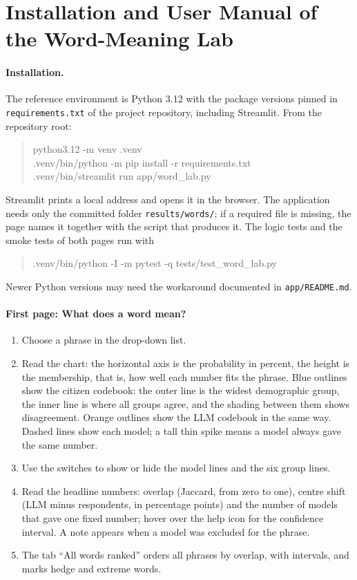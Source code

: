 \section{Installation and User Manual of the Word-Meaning Lab}
\label{app:manual}

\paragraph{Installation.}
The reference environment is Python 3.12 with the package versions pinned in \texttt{requirements.txt} of the project
repository, including Streamlit.
From the repository root:
\begin{quote}\small\ttfamily
python3.12 -m venv .venv\\
.venv/bin/python -m pip install -r requirements.txt\\
.venv/bin/streamlit run app/word\_lab.py
\end{quote}
Streamlit prints a local address and opens it in the browser.
The application needs only the committed folder \texttt{results/\allowbreak words/}; if a required file is missing,
the page names it together with the script that produces it.
The logic tests and the smoke tests of both pages run with
\begin{quote}\small\ttfamily
.venv/bin/python -I -m pytest -q tests/test\_word\_lab.py
\end{quote}
Newer Python versions may need the workaround documented in \texttt{app/README.md}.

\paragraph{First page: What does a word mean?}
\begin{enumerate}
\item Choose a phrase in the drop-down list.
\item Read the chart: the horizontal axis is the probability in percent, the height is the membership, that is, how well
each number fits the phrase. Blue outlines show the citizen codebook: the outer line is the widest demographic group,
the inner line is where all groups agree, and the shading between them shows disagreement. Orange outlines show the
LLM codebook in the same way. Dashed lines show each model; a tall thin spike means a model always gave the same number.
\item Use the switches to show or hide the model lines and the six group lines.
\item Read the headline numbers: overlap (Jaccard, from zero to one), centre shift (LLM minus respondents, in
percentage points) and the number of models that gave one fixed number; hover over the help icon for the confidence
interval. A note appears when a model was excluded for the phrase.
\item The tab ``All words ranked'' orders all phrases by overlap, with intervals, and marks hedge and extreme words.
\end{enumerate}

